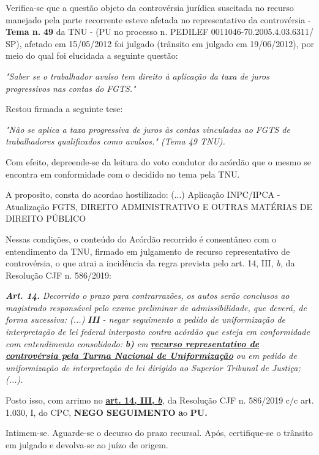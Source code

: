 \documentclass[12pt]{article}
\begin{document}
\justifying
\noindent Verifica-se que a questão objeto da controvérsia jurídica suscitada no recurso manejado pela parte recorrente esteve afetada no representativo da controvérsia - \textbf{Tema n. }\textbf{49} da TNU - (PU no processo n. PEDILEF 0011046-70.2005.4.03.6311/ SP),  afetado em 15/05/2012 foi julgado (trânsito em julgado em 19/06/2012), por meio do qual foi elucidada a seguinte questão:

\noindent \textit{"Saber se o trabalhador avulso tem direito à aplicação da taxa de juros progressivos nas contas do FGTS."}

\noindent Restou firmada a seguinte tese:

\noindent \textit{"Não se aplica a taxa progressiva de juros às contas vinculadas ao FGTS de trabalhadores qualificados como avulsos." (Tema 49 TNU).}

\noindent Com efeito, depreende-se da leitura do voto condutor do acórdão que o mesmo se encontra em conformidade com o decidido no  tema pela TNU.

\noindent A proposito, consta do acordao hostilizado: (...) Aplicação INPC/IPCA - Atualização FGTS, DIREITO ADMINISTRATIVO E OUTRAS MATÉRIAS DE DIREITO PÚBLICO

\noindent Nessas condições, o conteúdo do Acórdão recorrido é consentâneo com o entendimento da TNU, firmado em julgamento de recurso representativo de controvérsia, o que atrai a incidência da regra prevista pelo art. 14, III, \textit{b,} da Resolução CJF n. 586/2019:

\noindent \textit{\textbf{Art. 14.}}\textit{ Decorrido o prazo para contrarrazões, os autos serão conclusos ao magistrado responsável pelo exame preliminar de admissibilidade, que deverá, de forma sucessiva: (...) }\textit{\textbf{III }}\textit{- negar seguimento a pedido de uniformização de interpretação de lei federal interposto contra acórdão que esteja em conformidade com entendimento consolidado: }\textit{\textbf{b)}}\textit{ em }\uline{\textit{\textbf{recurso representativo de controvérsia pela Turma Nacional de Uniformização}}}\textit{ ou em pedido de uniformização de interpretação de lei dirigido ao Superior Tribunal de Justiça;(...).}

\noindent Posto isso, com arrimo no \uline{\textbf{art. 14, III, }}\uline{\textit{\textbf{b}}}\textit{,} da Resolução CJF n. 586/2019 c/c art. 1.030, I, do CPC, \textbf{NEGO SEGUIMENTO }\textbf{a}o\textbf{ PU}\textbf{.}

\noindent Intimem-se. Aguarde-se o decurso do prazo recursal. Após, certifique-se o trânsito em julgado e devolva-se ao juízo de origem.
\end{document}
